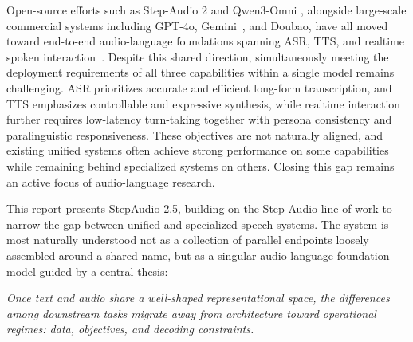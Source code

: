 \documentclass{llmxive}
\begin{document}
Open-source efforts such as Step-Audio 2 \citep{wu2025stepaudio2technicalreport} and Qwen3-Omni \citep{xu2025qwen3omnitechnicalreport}, alongside large-scale commercial systems including GPT-4o, Gemini~\citep{team2023gemini}, and Doubao, have all moved toward end-to-end audio-language foundations spanning ASR, TTS, and realtime spoken interaction~\citep{yan2025step,wu2025mind,wu2025chronological,zhang2026sla,cui2025recent,zhang2025mamba,liu2026code}. Despite this shared direction, simultaneously meeting the deployment requirements of all three capabilities within a single model remains challenging. ASR prioritizes accurate and efficient long-form transcription, and TTS emphasizes controllable and expressive synthesis, while realtime interaction further requires low-latency turn-taking together with persona consistency and paralinguistic responsiveness. These objectives are not naturally aligned, and existing unified systems often achieve strong performance on some capabilities while remaining behind specialized systems on others. Closing this gap remains an active focus of audio-language research.

This report presents StepAudio 2.5, building on the Step-Audio line of work \citep{wu2025stepaudio2technicalreport, tian2025step, zhang2026step} to narrow the gap between unified and specialized speech systems. The system is most naturally understood not as a collection of parallel endpoints loosely assembled around a shared name, but as a singular audio-language foundation model guided by a central thesis:

\begin{tcolorbox}[colback=gray!10, colframe=gray!10, boxrule=0pt, arc=2mm, halign=center]
\textit{Once text and audio share a well-shaped representational space, the differences among downstream tasks migrate away from architecture toward operational regimes: data, objectives, and decoding constraints.}
\end{tcolorbox}
\end{document}
